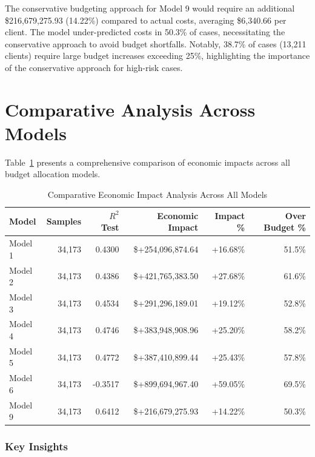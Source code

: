 The conservative budgeting approach for Model 9 would require an additional \$216,679,275.93 (14.22\%) compared to actual costs, averaging \$6,340.66 per client. The model under-predicted costs in 50.3\% of cases, necessitating the conservative approach to avoid budget shortfalls. Notably, 38.7\% of cases (13,211 clients) require large budget increases exceeding 25\%, highlighting the importance of the conservative approach for high-risk cases. 

\clearpage

\section{Comparative Analysis Across Models}
\label{subsec:comparative_impact}

Table~\ref{tab:all_models_impact_comparison} presents a comprehensive comparison of economic impacts across all budget allocation models.

\begin{table}[htbp]
\centering
\small
\caption{Comparative Economic Impact Analysis Across All Models}
\label{tab:all_models_impact_comparison}
\begin{tabular}{lrrrrr}
\toprule
\textbf{Model} & \textbf{Samples} & \textbf{$R^2$ Test} & \textbf{Economic Impact} & \textbf{Impact \%} & \textbf{Over Budget \%} \\
\midrule
Model 1 & 34,173 & 0.4300 & \$+254,096,874.64 & +16.68\% & 51.5\% \\
Model 2 & 34,173 & 0.4386 & \$+421,765,383.50 & +27.68\% & 61.6\% \\
Model 3 & 34,173 & 0.4534 & \$+291,296,189.01 & +19.12\% & 52.8\% \\
Model 4 & 34,173 & 0.4746 & \$+383,948,908.96 & +25.20\% & 58.2\% \\
Model 5 & 34,173 & 0.4772 & \$+387,410,899.44 & +25.43\% & 57.8\% \\
Model 6 & 34,173 & -0.3517 & \$+899,694,967.40 & +59.05\% & 69.5\% \\
Model 9 & 34,173 & 0.6412 & \$+216,679,275.93 & +14.22\% & 50.3\% \\
\bottomrule
\end{tabular}
\end{table}

\subsubsection{Key Insights}

